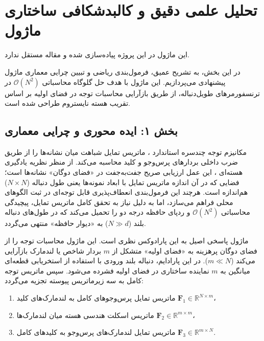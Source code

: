 \section{تحلیل علمی دقیق و کالبدشکافی ساختاری ماژول }

این ماژول در این پروژه پیاده‌سازی شده و مقاله مستقل ندارد.
\label{sec:primal_attention}

در این بخش، به تشریح عمیق، فرمول‌بندی ریاضی و تبیین چرایی معماری ماژول پیشنهادی  می‌پردازیم. این ماژول با هدف حل گلوگاه محاسباتی $\mathcal{O}(N^2)$ در ترنسفورمرهای طویل‌دنباله، از طریق بازآرایی محاسبات توجه در فضای اولیه  بر اساس تقریب هسته نایستروم  طراحی شده است.

\subsection*{بخش ۱: ایده محوری و چرایی معماری }
مکانیزم توجه چندسره استاندارد ، ماتریس تمایل شباهت میان نشانه‌ها را از طریق ضرب داخلی بردارهای پرس‌وجو و کلید محاسبه می‌کند. از منظر نظریه یادگیری هسته‌ای ، این عمل ارزیابی صریح جفت‌به‌جفت در «فضای دوگان»  نشانه‌ها است؛ فضایی که در آن اندازه ماتریس تمایل با ابعاد نمونه‌ها یعنی طول دنباله ($N \times N$) هم‌اندازه است. هرچند این فرمول‌بندی انعطاف‌پذیری قابل توجه‌ای در ثبت الگوهای محلی فراهم می‌سازد، اما به دلیل نیاز به تحقق کامل ماتریس تمایل، پیچیدگی محاسباتی $\mathcal{O}(N^2)$ و ردپای حافظه درجه دو را تحمیل می‌کند که در طول‌های دنباله بلند ($N \gg d$) به «دیوار حافظه»  منتهی می‌گردد.

ماژول  پاسخی اصیل به این پارادوکس نظری است. این ماژول محاسبات توجه را از فضای دوگان پرهزینه به «فضای اولیه»  متشکل از $m$ بردار شاخص یا لندمارک بازآرایی می‌کند ($m \ll N$). در این پارادایم، دنباله بلند ورودی با استفاده از استخریابی قطعه‌ای میانگین  به $m$ نماینده ساختاری در فضای اولیه فشرده می‌شود. سپس ماتریس توجه کامل به سه زیرماتریس پیوسته تجزیه می‌گردد:
\begin{enumerate}
    \item ماتریس تمایل پرس‌وجوهای کامل به لندمارک‌های کلید $\mathbf{F}_1 \in \mathbb{R}^{N \times m}$،
    \item ماتریس اسکلت هندسی هسته میان لندمارک‌ها $\mathbf{F}_2 \in \mathbb{R}^{m \times m}$،
    \item ماتریس تمایل لندمارک‌های پرس‌وجو به کلیدهای کامل $\mathbf{F}_3 \in \mathbb{R}^{m \times N}$.
\end{enumerate}

